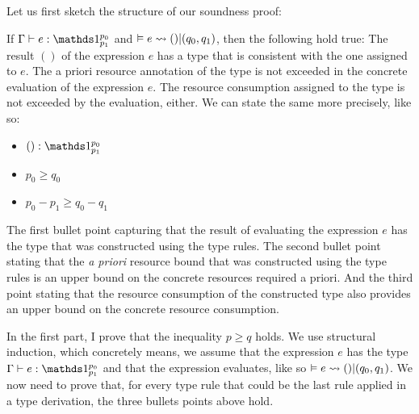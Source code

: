 Let us first sketch the structure of our soundness proof:

If \(\Gamma \vdash e : \unit^{p_0}_{p_1}\) and \(\vDash e \rightsquigarrow  () | (q_0, q_1) \), then the following hold true:
The result \(()\) of the expression \(e\) has a type that is consistent with the one assigned to \(e\). The a priori resource annotation of the type is not exceeded in the concrete evaluation of the expression \(e\). The resource consumption assigned to the type is not exceeded by the evaluation, either. We can state the same more precisely, like so: 

\begin{itemize}
   \item \(() : \unit^{p_0}_{p_1}\) 
   \item \(p_0 \geq q_0\)     
   \item \(p_0 - p_1 \geq q_0 - q_1\)
\end{itemize}

The first bullet point capturing that the result of evaluating the expression \(e\) has the type that was constructed using the type rules. The second bullet point stating that the \emph{a priori} resource bound that was constructed using the type rules is an upper bound on the concrete resources required a priori. And the third point stating that the resource consumption of the constructed type also provides an upper bound on the concrete resource consumption.

In the first part, I prove that the inequality \(p \geq q\) holds. We use structural induction, which concretely means, we assume that the expression \(e\) has the type \(\Gamma \vdash e : \unit^{p_0}_{p_1}\) and that the expression evaluates, like so \(\vDash e \rightsquigarrow () | (q_0, q_1)\). We now need to prove that, for every type rule that could be the last rule applied in a type derivation, the three bullets points above hold. 

